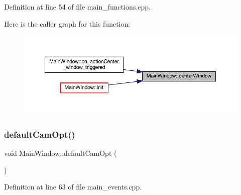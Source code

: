Definition at line 54 of file main\+\_\+functions.\+cpp.

Here is the caller graph for this function\+:
\nopagebreak
\begin{figure}[H]
\begin{center}
\leavevmode
\includegraphics[width=350pt]{classMainWindow_a775d79cb8170d36faf4aa9ce4570d8b3_icgraph}
\end{center}
\end{figure}
\mbox{\label{classMainWindow_ad6c3df0bfe7f2357d3f2083e20e3810a}} 
\subsubsection{\texorpdfstring{defaultCamOpt()}{defaultCamOpt()}}
{\footnotesize\ttfamily void Main\+Window\+::default\+Cam\+Opt (\begin{DoxyParamCaption}{ }\end{DoxyParamCaption})\hspace{0.3cm}{\ttfamily [private]}}



Definition at line 63 of file main\+\_\+events.\+cpp.

